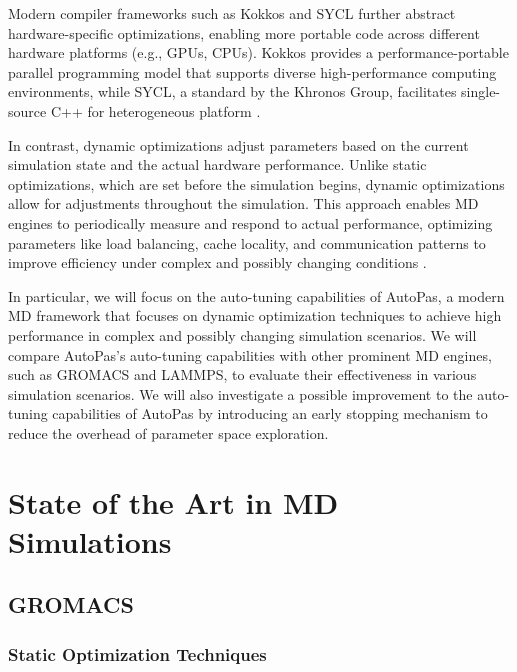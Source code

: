 \documentclass[conference]{IEEEtran}
\begin{document}
Modern compiler frameworks such as Kokkos and SYCL further abstract hardware-specific optimizations, enabling more portable code across different hardware platforms (e.g., GPUs, CPUs). Kokkos provides a performance-portable parallel programming model that supports diverse high-performance computing environments, while SYCL, a standard by the Khronos Group, facilitates single-source C++ for heterogeneous platform .

In contrast, dynamic optimizations adjust parameters based on the current simulation state and the actual hardware performance. Unlike static optimizations, which are set before the simulation begins, dynamic optimizations allow for adjustments throughout the simulation. This approach enables MD engines to periodically measure and respond to actual performance, optimizing parameters like load balancing, cache locality, and communication patterns to improve efficiency under complex and possibly changing conditions .


In particular, we will focus on the auto-tuning capabilities of AutoPas, a modern MD framework that focuses on dynamic optimization techniques to achieve high performance in complex and possibly changing simulation scenarios. We will compare AutoPas's auto-tuning capabilities with other prominent MD engines, such as GROMACS and LAMMPS, to evaluate their effectiveness in various simulation scenarios. We will also investigate a possible improvement to the auto-tuning capabilities of AutoPas by introducing an early stopping mechanism to reduce the overhead of parameter space exploration.


\section{State of the Art in MD Simulations}


\subsection{GROMACS}

\subsubsection{Static Optimization Techniques}
\end{document}
